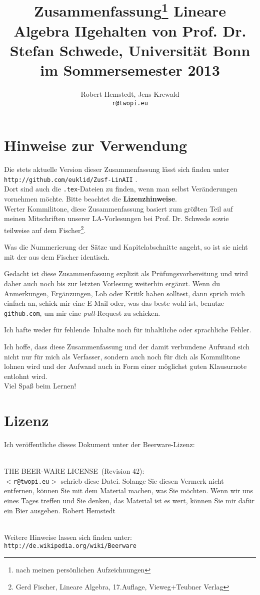 \documentclass[12pt,a4paper]{article}
\author{Robert Hemstedt, Jens Krewald \\ \texttt{r@twopi.eu}}
\title{Zusammenfassung\footnote{nach meinen pers\"onlichen Aufzeichnungen} Lineare Algebra II\newline \newline \large{gehalten von Prof. Dr. Stefan Schwede, Universität Bonn} \\im Sommersemester 2013}
\theoremstyle{plain}
\numberwithin{equation}{section}
\newenvironment{fmpage}[1]
{\begin{lrbox}{\fmbox}\begin{minipage}{#1}}
{\end{minipage}\end{lrbox}\fbox{\usebox{\fmbox}}}
\begin{document}
\maketitle
\section*{Hinweise zur Verwendung}
Die stets aktuelle Version dieser Zusammenfassung lässt sich finden unter\\
\texttt{http://github.com/euklid/Zusf-LinAII} .\\
Dort sind auch die \texttt{.tex}-Dateien zu finden, wenn man selbst Veränderungen vornehmen möchte. Bitte beachtet die \textbf{Lizenzhinweise}.\\

Werter Kommilitone, diese Zusammenfassung basiert zum größten Teil auf meinen Mitschriften unserer LA-Vorlesungen bei Prof. Dr. Schwede sowie teilweise auf dem Fischer\footnote{Gerd Fischer, Lineare Algebra, 17.Auflage, Vieweg+Teubner Verlag}. 

Was die Nummerierung der Sätze und Kapitelabschnitte angeht, so ist sie nicht mit der aus dem Fischer identisch.

Gedacht ist diese Zusammenfassung explizit als Prüfungsvorbereitung und wird daher auch noch bis zur letzten Vorlesung weiterhin ergänzt. Wenn du Anmerkungen, Ergänzungen, Lob oder Kritik haben solltest, dann sprich mich einfach an, schick mir eine E-Mail oder, was das beste wohl ist, benutze \texttt{github.com}, um mir eine \textit{pull}-Request zu schicken.

Ich hafte weder für \glqq fehlende\grqq\ Inhalte noch für inhaltliche oder sprachliche Fehler.

Ich hoffe, dass diese Zusammenfassung und der damit verbundene Aufwand sich nicht nur für mich als Verfasser, sondern auch noch für dich als Kommilitone lohnen wird und der Aufwand auch in Form einer möglichst guten Klausurnote entlohnt wird. \\
Viel Spaß beim Lernen!
\section*{Lizenz}
Ich veröffentliche dieses Dokument unter der Beerware-Lizenz:\\ \\
\hspace{-3.5cm}
\begin{fmpage}{\textwidth}
\glqq THE BEER-WARE LICENSE\grqq\ (Revision 42):\\
\texttt{$<$r@twopi.eu$>$} schrieb diese Datei. Solange Sie diesen Vermerk nicht entfernen, können Sie mit dem Material machen, was Sie möchten. Wenn wir uns eines Tages treffen und Sie denken, das Material ist es wert, können Sie mir dafür ein Bier ausgeben. Robert Hemstedt
\end{fmpage}
\hspace{3.5cm} \\
Weitere Hinweise lassen sich finden unter: \texttt{http://de.wikipedia.org/wiki/Beerware}
\end{document}
